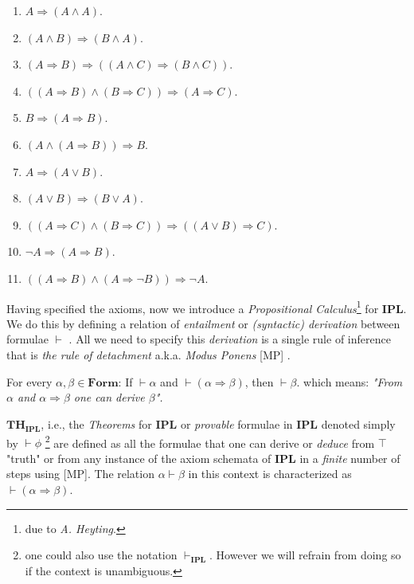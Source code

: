 		\begin{enumerate}
			\item $ A \Rightarrow (A \land A) $.
			\item $ (A \land B) \Rightarrow (B \land A) $.
			\item $ (A \Rightarrow B) \Rightarrow ((A \land C) \Rightarrow (B \land C)) $.
			\item $ ((A \Rightarrow B) \land (B \Rightarrow C)) \Rightarrow (A \Rightarrow C) $.
			\item $ B \Rightarrow (A \Rightarrow B) $.
			\item $ (A \land (A \Rightarrow B)) \Rightarrow B $.
			\item $ A \Rightarrow (A \lor B) $.
			\item $ (A \lor B) \Rightarrow (B \lor A) $.
			\item $ ((A \Rightarrow C) \land (B \Rightarrow C)) \Rightarrow ((A \lor B) \Rightarrow C) $.
			\item $ \neg A \Rightarrow (A \Rightarrow B) $.
			\item $ ((A \Rightarrow B) \land (A \Rightarrow \neg B)) \Rightarrow \neg A $.
		\end{enumerate}
				
	Having specified the axioms, now we introduce a \emph{Propositional Calculus}\footnote{due to \emph{A. Heyting}.} for \textbf{IPL}. 
	We do this by defining a relation of \emph{entailment} or  \emph{(syntactic) derivation} between formulae
	 $\vdash$ .  \newline
	All we need to specify this \emph{derivation} is a single rule of inference that is \emph{the rule of detachment} a.k.a. \emph{Modus Ponens} [MP] .
	
	\begin{definition}[MP] For every $\alpha,\beta \in \mathbf{Form}$: \newline
		If $\vdash \alpha$ and $\vdash (\alpha \Rightarrow \beta)$, then $\vdash \beta$.
		 \newline
		which means: 
		\emph{"From $\alpha$ and $\alpha \Rightarrow \beta$ one can derive $\beta$".}
	\end{definition}
	
	$\textbf{TH}_{\textbf{IPL}}$, i.e., the \emph{Theorems} for \textbf{IPL} or \emph{provable} formulae in \textbf{IPL} denoted simply by $\vdash \phi$ \footnote{one could also use the notation $\vdash_{\textbf{IPL}}$. However we will refrain from doing so if the context is unambiguous.} are defined as all the formulae that one can derive or \emph{deduce} from $\top$ "truth" or from any instance of the axiom schemata of \textbf{IPL} in a \emph{finite} number of steps using [MP].
	\newline The relation $\alpha \vdash \beta$ in this context is characterized as $\vdash (\alpha \Rightarrow \beta)$.
	\newline
		
